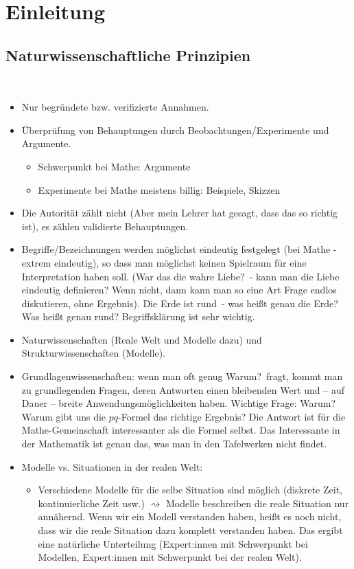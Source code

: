 \chapter*{Einleitung}

\section{Naturwissenschaftliche Prinzipien}

\begin{bem}\ 
	\begin{itemize}
		\item Nur begründete bzw. verifizierte Annahmen. 
		\item Überprüfung von Behauptungen durch Beobachtungen/Experimente und Argumente. 
		\begin{itemize}
			\item Schwerpunkt bei Mathe: Argumente 
			\item Experimente bei Mathe meistens billig: Beispiele, Skizzen
		\end{itemize} 
		\item Die Autorität zählt nicht (\glqq Aber mein Lehrer hat gesagt, dass das so richtig ist\grqq), es zählen validierte Behauptungen. 
		\item Begriffe/Bezeichnungen werden möglichst eindeutig festgelegt (bei Mathe - extrem eindeutig),  so dass man möglichst keinen Spielraum für eine Interpretation haben soll. (\glqq War das die wahre Liebe?\grqq\ - kann man die Liebe eindeutig definieren? Wenn nicht, dann kann man so eine Art Frage endlos diskutieren, ohne Ergebnis). \glqq Die Erde ist rund\grqq\ - was heißt genau \glqq die Erde\grqq? Was heißt genau \glqq rund\grqq? Begriffsklärung ist sehr wichtig. 
		\item Naturwissenschaften (Reale Welt und Modelle dazu) und  Strukturwissenschaften (Modelle). 
		\item Grundlagenwissenschaften: wenn man oft genug  \glqq Warum?\grqq\ fragt, kommt man zu grundlegenden Fragen, deren Antworten einen bleibenden Wert und -- auf Dauer -- breite Anwendungsmöglichkeiten haben. Wichtige Frage: Warum? Warum gibt uns die $pq$-Formel das richtige Ergebnis? Die Antwort ist für die Mathe-Gemeinschaft interessanter als die Formel selbst. Das Interessante in der Mathematik ist genau das, was man in den Tafelwerken nicht findet. 
		\item Modelle vs. Situationen in der realen Welt: 
		\begin{itemize}
			\item Verschiedene Modelle für die selbe Situation sind möglich (diskrete Zeit, kontinuierliche Zeit usw.) $\rightsquigarrow$ Modelle beschreiben die reale Situation nur annähernd. Wenn wir ein Modell verstanden haben, heißt es noch nicht, dass wir die reale Situation dazu komplett verstanden haben. Das ergibt eine natürliche Unterteilung (Expert:innen mit Schwerpunkt bei Modellen, Expert:innen mit Schwerpunkt bei der realen Welt). 

\end{itemize}
\end{itemize}
\end{bem}
